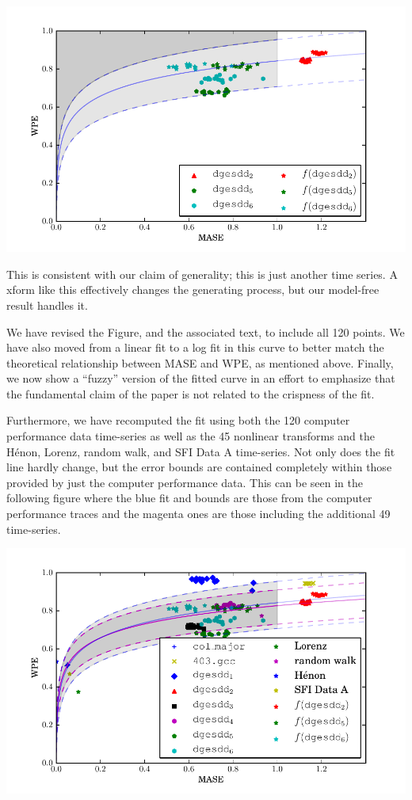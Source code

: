 \documentclass[12pt]{article}
\begin{document}
\begin{center}
    \includegraphics[width=0.8\columnwidth]{figs/nonlinear_transform_data}
\end{center}

This is consistent with our claim of generality; this is just another
time series.  A xform like this effectively changes the generating
process, but our model-free result handles it.

We have revised the Figure, and the associated text, to include all
120 points.  We have also moved from a linear fit to a log fit in this
curve to better match the theoretical relationship between MASE and
WPE, as mentioned above.  Finally, we now show a ``fuzzy'' version of
the fitted curve in an effort to emphasize that the fundamental claim
of the paper is not related to the crispness of the fit.

Furthermore, we have recomputed the fit using both the 120 computer performance
data time-series as well as the 45 nonlinear transforms and the H\'{e}non, Lorenz,
random walk, and SFI Data A time-series. Not only does the fit line hardly
change, but the error bounds are contained completely within those provided by
just the computer performance data. This can be seen in the following figure
where the blue fit and bounds are those from the computer performance traces and
the magenta ones are those including the additional 49 time-series.

\begin{center}
    \includegraphics[width=0.8\columnwidth]{figs/new_prediction_vs_entropy_extras_with_nonlinear_all_points}
\end{center}
\end{document}
